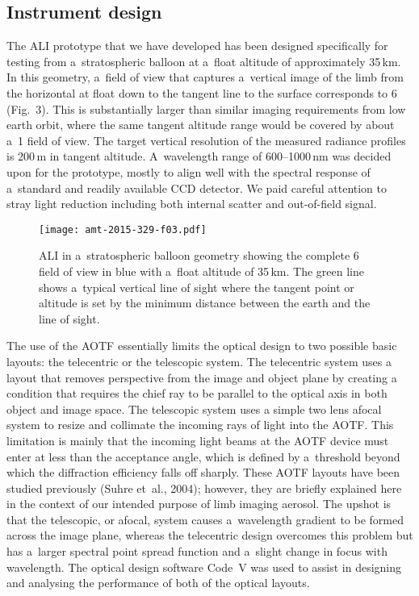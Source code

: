 \documentclass[amt]{copernicus}
\begin{document}
\subsection{Instrument design}

The ALI prototype that we have developed has been designed
specifically for testing from a~stratospheric balloon at a~float
altitude of approximately 35\,\unit{km}. In this geometry, a~field of
view that captures a~vertical image of the limb from the horizontal at
float down to the tangent line to the surface corresponds to
6{\degree} (Fig.~3). This is substantially larger than similar imaging
requirements from low earth orbit, where the same tangent altitude
range would be covered by about a~1{\degree} field of view. The target
vertical resolution of the measured radiance profiles is 200\,\unit{m}
in tangent altitude. A~wavelength range of 600--1000\,\unit{nm} was
decided upon for the prototype, mostly to align well with the spectral
response of a~standard and readily available CCD detector. We paid careful attention to stray light reduction including
both internal scatter and out-of-field signal.

\begin{figure}[t]
\texttt{[image: amt-2015-329-f03.pdf]}
\caption{ALI in a~stratospheric balloon geometry showing the complete
  6{\degree} field of view in blue with a~float altitude of
  35\,\unit{km}. The green line shows a~typical vertical line of sight
  where the tangent point or altitude is set by the minimum distance
  between the earth and the line of sight.}
\end{figure}


The use of the AOTF essentially limits the optical design to two
possible basic layouts: the telecentric or the telescopic system. The telecentric system uses a
layout that removes perspective from the image and object plane by creating a condition
that requires the chief ray to be parallel to the optical axis in both object and image
space. The telescopic system uses a simple two lens afocal system to resize and collimate
the incoming rays of light into the AOTF. This
limitation is mainly that the incoming light beams at the AOTF device
must enter at less than the acceptance angle, which is defined by
a~threshold beyond which the diffraction efficiency falls off
sharply. These AOTF layouts have been studied previously (Suhre
et~al., 2004); however, they are briefly explained here in the context
of our intended purpose of limb imaging aerosol. The upshot is that
the telescopic, or afocal, system causes a~wavelength gradient to be
formed across the image plane, whereas the telecentric design
overcomes this problem but has a~larger spectral point spread
function and a~slight change in focus with wavelength. The optical
design software Code~V was used to assist in designing and analysing
the performance of both of the optical layouts.
\end{document}
